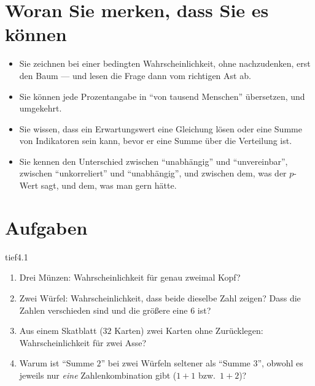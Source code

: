\section{Woran Sie merken, dass Sie es können}
\begin{itemize}[leftmargin=1.2em,itemsep=2pt]
\item Sie zeichnen bei einer bedingten Wahrscheinlichkeit, ohne nachzudenken, erst den Baum --- und lesen die Frage dann vom richtigen Ast ab.
\item Sie können jede Prozentangabe in \enquote{von tausend Menschen} übersetzen, und umgekehrt.
\item Sie wissen, dass ein Erwartungswert eine Gleichung lösen oder eine Summe von Indikatoren sein kann, bevor er eine Summe über die Verteilung ist.
\item Sie kennen den Unterschied zwischen \enquote{unabhängig} und \enquote{unvereinbar}, zwischen \enquote{unkorreliert} und \enquote{unabhängig}, und zwischen dem, was der $p$-Wert sagt, und dem, was man gern hätte.
\end{itemize}

\section{Aufgaben}

\begin{karte}{tief}{4.1}{\typtypisch}{}
\begin{enumerate}[label=(\alph*),leftmargin=1.6em,itemsep=2pt]
\item Drei Münzen: Wahrscheinlichkeit für genau zweimal Kopf?
\item Zwei Würfel: Wahrscheinlichkeit, dass beide dieselbe Zahl zeigen? Dass die Zahlen verschieden sind und die größere eine $6$ ist?
\item Aus einem Skatblatt ($32$ Karten) zwei Karten ohne Zurücklegen: Wahrscheinlichkeit für zwei Asse?
\item Warum ist \enquote{Summe $2$} bei zwei Würfeln seltener als \enquote{Summe $3$}, obwohl es jeweils nur \emph{eine} Zahlenkombination gibt ($1 + 1$ bzw.\ $1 + 2$)?
\end{enumerate}
\end{karte}

